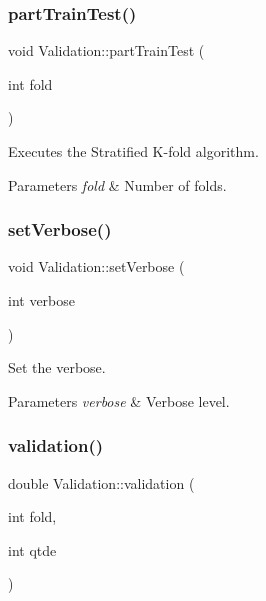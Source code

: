 \subsubsection{\texorpdfstring{part\+Train\+Test()}{partTrainTest()}}
{\footnotesize\ttfamily void Validation\+::part\+Train\+Test (\begin{DoxyParamCaption}\item[{int}]{fold }\end{DoxyParamCaption})}



Executes the Stratified K-\/fold algorithm. 


\begin{DoxyParams}{Parameters}
{\em fold} & Number of folds. \\
\hline
\end{DoxyParams}
\mbox{\label{class_validation_ac402fbabbd6148d7c2ac0c7c9a854177}} 
\subsubsection{\texorpdfstring{set\+Verbose()}{setVerbose()}}
{\footnotesize\ttfamily void Validation\+::set\+Verbose (\begin{DoxyParamCaption}\item[{int}]{verbose }\end{DoxyParamCaption})\hspace{0.3cm}{\ttfamily [inline]}}



Set the verbose. 


\begin{DoxyParams}{Parameters}
{\em verbose} & Verbose level. \\
\hline
\end{DoxyParams}
\mbox{\label{class_validation_a8d4b505b7e85e1fc9c90515ad3454977}} 
\subsubsection{\texorpdfstring{validation()}{validation()}}
{\footnotesize\ttfamily double Validation\+::validation (\begin{DoxyParamCaption}\item[{int}]{fold,  }\item[{int}]{qtde }\end{DoxyParamCaption})}



